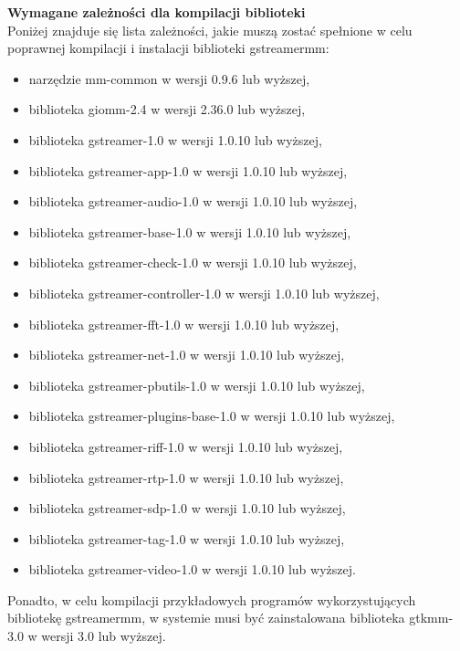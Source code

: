 \documentclass[12pt]{article}
\begin{document}
\textbf{Wymagane zależności dla kompilacji biblioteki}\\
Poniżej znajduje się lista zależności, jakie muszą zostać spełnione w celu poprawnej kompilacji i instalacji biblioteki gstreamermm:
\begin{itemize}
  \setlength{\itemsep}{0em}
\item narzędzie mm-common w wersji 0.9.6 lub wyższej,
\item biblioteka giomm-2.4 w wersji 2.36.0 lub wyższej,
\item biblioteka gstreamer-1.0 w wersji 1.0.10 lub wyższej,
\item biblioteka gstreamer-app-1.0 w wersji 1.0.10 lub wyższej,
\item biblioteka gstreamer-audio-1.0 w wersji 1.0.10 lub wyższej,
\item biblioteka gstreamer-base-1.0 w wersji 1.0.10 lub wyższej,
\item biblioteka gstreamer-check-1.0 w wersji 1.0.10 lub wyższej,
\item biblioteka gstreamer-controller-1.0 w wersji 1.0.10 lub wyższej,
\item biblioteka gstreamer-fft-1.0 w wersji 1.0.10 lub wyższej,
\item biblioteka gstreamer-net-1.0 w wersji 1.0.10 lub wyższej,
\item biblioteka gstreamer-pbutils-1.0 w wersji 1.0.10 lub wyższej,
\item biblioteka gstreamer-plugins-base-1.0 w wersji 1.0.10 lub wyższej,
\item biblioteka gstreamer-riff-1.0 w wersji 1.0.10 lub wyższej,
\item biblioteka gstreamer-rtp-1.0 w wersji 1.0.10 lub wyższej,
\item biblioteka gstreamer-sdp-1.0 w wersji 1.0.10 lub wyższej,
\item biblioteka gstreamer-tag-1.0 w wersji 1.0.10 lub wyższej,
\item biblioteka gstreamer-video-1.0 w wersji 1.0.10 lub wyższej.
\end{itemize}
Ponadto, w celu kompilacji przykładowych programów wykorzystujących bibliotekę gstreamermm, w systemie musi być zainstalowana biblioteka gtkmm-3.0 w wersji 3.0 lub wyższej.
\end{document}
